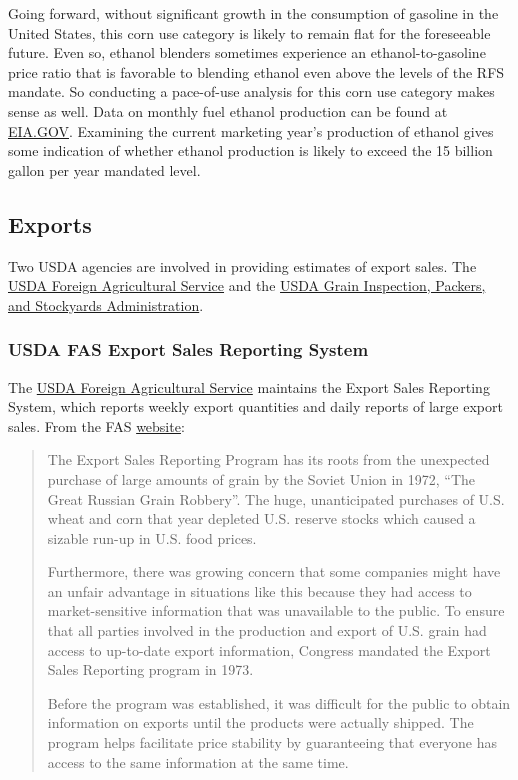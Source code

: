 \documentclass[
]{book}
\begin{document}
Going forward, without significant growth in the consumption of gasoline
in the United States, this corn use category is likely to remain flat
for the foreseeable future. Even so, ethanol blenders sometimes
experience an ethanol-to-gasoline price ratio that is favorable to
blending ethanol even above the levels of the RFS mandate. So conducting
a pace-of-use analysis for this corn use category makes sense as well.
Data on monthly fuel ethanol production can be found at
\href{http://www.eia.gov/totalenergy/data/monthly/\#renewable}{EIA.GOV}.
Examining the current marketing year's production of ethanol gives some
indication of whether ethanol production is likely to exceed the 15
billion gallon per year mandated level.

\hypertarget{exports-1}{%
\subsection{Exports}\label{exports-1}}

Two USDA agencies are involved in providing estimates of export sales.
The \href{http://www.fas.usda.gov/}{USDA Foreign Agricultural Service} and
the \href{http://www.gipsa.usda.gov/}{USDA Grain Inspection, Packers, and Stockyards
Administration}.

\hypertarget{usda-fas-export-sales-reporting-system}{%
\subsubsection{USDA FAS Export Sales Reporting System}\label{usda-fas-export-sales-reporting-system}}

The \href{http://www.fas.usda.gov/}{USDA Foreign Agricultural Service}
maintains the Export Sales Reporting System, which reports weekly export
quantities and daily reports of large export sales. From the FAS
\href{https://apps.fas.usda.gov/export-sales/FACT\%20SHEET.pdf}{website}:

\begin{quote}
The Export Sales Reporting Program has its roots from the unexpected
purchase of large amounts of grain by the Soviet Union in 1972, ``The
Great Russian Grain Robbery''. The huge, unanticipated purchases of
U.S. wheat and corn that year depleted U.S. reserve stocks which
caused a sizable run-up in U.S. food prices.

Furthermore, there was growing concern that some companies might have
an unfair advantage in situations like this because they had access to
market-sensitive information that was unavailable to the public. To
ensure that all parties involved in the production and export of U.S.
grain had access to up-to-date export information, Congress mandated
the Export Sales Reporting program in 1973.

Before the program was established, it was difficult for the public to
obtain information on exports until the products were actually
shipped. The program helps facilitate price stability by guaranteeing
that everyone has access to the same information at the same time.
\end{quote}
\end{document}
